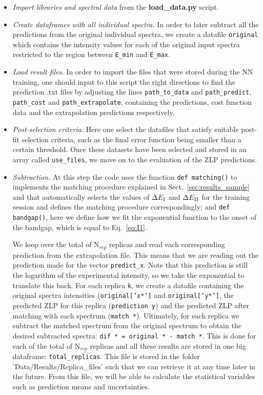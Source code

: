 \begin{itemize}
  
\item {\it Import libraries and spectral data} from the {\bf load\_data.py} script.

\item {\it Create dataframes with all individual spectra.}
In order to later subtract all the predictions from the original individual spectra, we create a datafile
{\tt original} which contains the intensity values for each of the original input spectra restricted to the region between
 {\tt E\_min} and {\tt E\_max}.

\item {\it Load result files.}
In order to import the files that were stored during the NN training, 
one should input to this script the right directions to find the prediction .txt files
by adjusting the lines {\tt path\_to\_data} and {\tt path\_predict}, {\tt path\_cost} and {\tt path\_extrapolate}, 
containing the predictions, cost function data and the extrapolation predictions respectively.

\item {\it Post-selection criteria.}
  Here one select the datafiles that satisfy suitable post-fit selection
  criteria, such as the final error function being smaller
  than a certain threshold. 
Once these datasets have been selected and stored in an array called {\tt use\_files},
we move on to the evaluation of the ZLP predictions. 

\item {\it Subtraction.}
 At this step the code uses the function {\tt def matching()} to
  implements the matching procedure
  explained in Sect.~\ref{sec:results_sample}
  and that  automatically selects the
values of $\Delta E_{\rm I}$ and $\Delta E_{\rm II}$ for the training session and defines the matching procedure
correspondingly; and  {\tt def bandgap()},
here we define how we fit the exponential function to the onset of the bandgap,
which is equal to Eq.~\ref{eq:I1}. 

We loop over the total of N$_{rep}$ replicas and read each corresponding prediction from the 
extrapolation file. 
%
This means that we are reading out the prediction made for the vector {\tt predict\_x}. Note that
this prediction is still the logarithm of the experimental intensity, so we take the exponential
to translate this back.
%
For each replica {\tt k}, we create a datafile containing the original spectra intensities 
({\tt original['x*']} and {\tt original['y*']}, the predicted ZLP for this replica ({\tt prediction y}) 
and the predicted ZLP after matching with each spectrum ({\tt match *}). 
%
Ultimately, for each replica we subtract the matched spectrum from the original spectrum 
to obtain the desired subtracted spectra: {\tt dif * = original * - match *}. 
%
This is done for each of the total of N$_{rep}$ replicas and all these results are stored in one big 
dataframe: {\tt total\_replicas}. 
%
This file is stored in the folder 'Data/Results/Replica\_files' such that we can retrieve it at any time
later in the future. 
%
From this file, we will be able to calculate the
statistical variables such as prediction means and uncertainties. 


\end{itemize}
